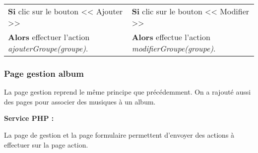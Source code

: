             \begin{center}
                \begin{tabular}{l | l}
                    \textbf{Si} clic sur le bouton << Ajouter >> & \textbf{Si} clic sur le bouton << Modifier >> \\
                    \textbf{Alors} effectuer l'action \emph{ajouterGroupe(groupe)}. & \textbf{Alors} effectue l'action \emph{modifierGroupe(groupe)}.
                \end{tabular}
            \end{center}
            
			
            
    \newpage

		\subsubsection{Page gestion album}

			\begin{paragraphe}
                La page gestion reprend le même principe que précédemment. On a rajouté aussi des pages pour associer des musiques à un album.
			\end{paragraphe}

			\begin{paragraphe}
				\textbf{Service PHP :}
			\end{paragraphe}
            
            \begin{paragraphe}
                La page de gestion et la page formulaire permettent d'envoyer des actions à effectuer sur la page action.
			\end{paragraphe}

